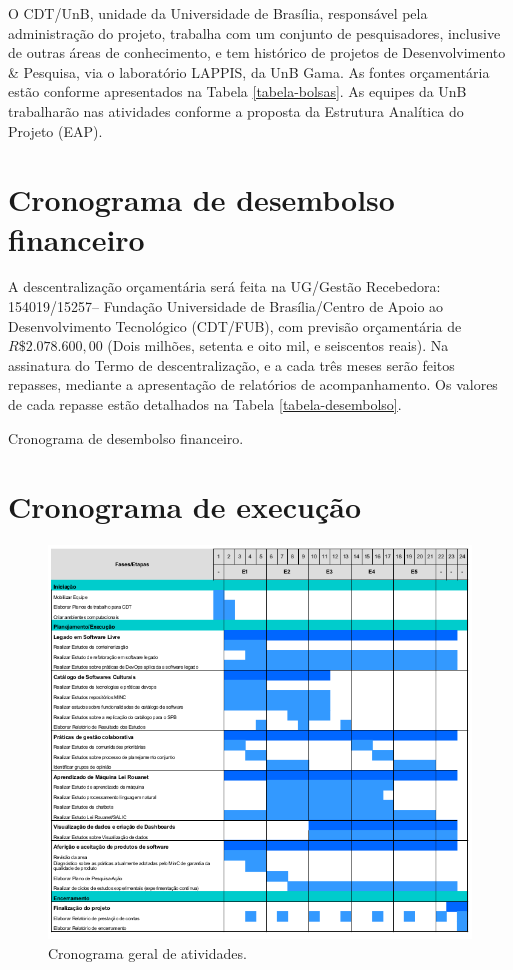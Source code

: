 O CDT/UnB, unidade da Universidade de Brasília, responsável pela administração
do projeto, trabalha com um conjunto de pesquisadores, inclusive de outras
áreas de conhecimento, e tem histórico de projetos de Desenvolvimento \&
Pesquisa, via o laboratório LAPPIS, da UnB Gama.
%
As fontes orçamentária estão conforme apresentados na Tabela
 \ref{tabela-bolsas}. 
%
As equipes da UnB trabalharão nas atividades conforme a proposta da Estrutura
Analítica do Projeto (EAP).

\newpage
\section{Cronograma de desembolso financeiro}
\label{sec:financeiro}

A descentralização orçamentária será feita  na UG/Gestão Recebedora: 
154019/15257– Fundação Universidade de Brasília/Centro de Apoio ao 
Desenvolvimento Tecnológico (CDT/FUB), com previsão orçamentária de $
 R\$2.078.600,00$ (Dois milhões, setenta e oito mil, e seiscentos reais).
 Na assinatura do Termo de descentralização, e a cada três meses serão feitos repasses, mediante
 a apresentação de relatórios de acompanhamento. Os valores de cada repasse estão detalhados
 na Tabela \ref{tabela-desembolso}.
\begin{landscape}
\begin{table}[!htb]
 
\caption{Cronograma de desembolso financeiro.}
\label{tabela-desembolso}
\end{table}
\end{landscape}
\section{Cronograma de execução}
\label{sec:cronograma}

\begin{figure}[!htb]
\centering
\includegraphics[scale=0.65]{figuras/Cronograma-LAPPIS-MINC.png}
\caption{Cronograma geral de atividades.}
\label{figura-cronograma}
\end{figure}

